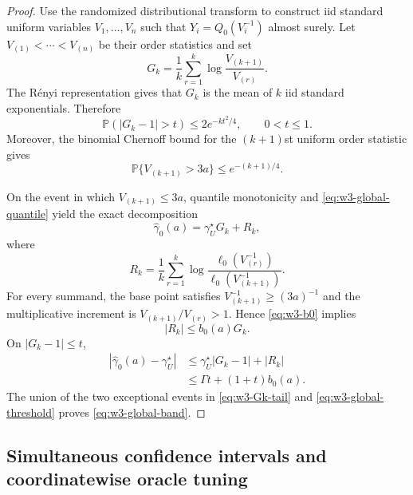 \documentclass[11pt]{article}
\theoremstyle{remark}
\newcommand{\Pp}{\mathbb P}
\begin{document}
\begin{proof}
Use the randomized distributional transform to construct iid standard
uniform variables $V_1,\ldots,V_n$ such that
$Y_i=Q_0(V_i^{-1})$ almost surely.  Let
$V_{(1)}<\cdots<V_{(n)}$ be their order statistics and set
\begin{equation}
 G_k=\frac1k\sum_{r=1}^k
 \log\frac{V_{(k+1)}}{V_{(r)}}.
 \label{eq:w3-Gk}
\end{equation}
The R\'enyi representation gives that $G_k$ is the mean of $k$ iid standard
exponentials.  Therefore
\begin{equation}
 \Pp(|G_k-1|>t)\le2e^{-kt^2/4},
 \qquad 0<t\le1.
 \label{eq:w3-Gk-tail}
\end{equation}
Moreover, the binomial Chernoff bound for the $(k+1)$st uniform order
statistic gives
\begin{equation}
 \Pp\{V_{(k+1)}>3a\}\le e^{-(k+1)/4}.
 \label{eq:w3-global-threshold}
\end{equation}

On the event in which $V_{(k+1)}\le3a$, quantile monotonicity and
\eqref{eq:w3-global-quantile} yield the exact decomposition
\begin{equation}
 \widehat\gamma_0(a)=\gamma_U^\star G_k+R_k,
 \label{eq:w3-global-decomp}
\end{equation}
where
\begin{equation}
 R_k=\frac1k\sum_{r=1}^k
 \log\frac{\ell_0(V_{(r)}^{-1})}
               {\ell_0(V_{(k+1)}^{-1})}.
 \label{eq:w3-global-R}
\end{equation}
For every summand, the base point satisfies
$V_{(k+1)}^{-1}\ge(3a)^{-1}$ and the multiplicative increment is
$V_{(k+1)}/V_{(r)}>1$.  Hence \eqref{eq:w3-b0} implies
\begin{equation}
 |R_k|\le b_0(a)G_k.
 \label{eq:w3-global-Rbound}
\end{equation}
On $|G_k-1|\le t$,
\begin{align*}
 |\widehat\gamma_0(a)-\gamma_U^\star|
 &\le\gamma_U^\star|G_k-1|+|R_k|\\
 &\le\Gamma t+(1+t)b_0(a).
\end{align*}
The union of the two exceptional events in
\eqref{eq:w3-Gk-tail} and \eqref{eq:w3-global-threshold} proves
\eqref{eq:w3-global-band}.
\end{proof}

\subsection{Simultaneous confidence intervals and coordinatewise oracle tuning}
\end{document}

